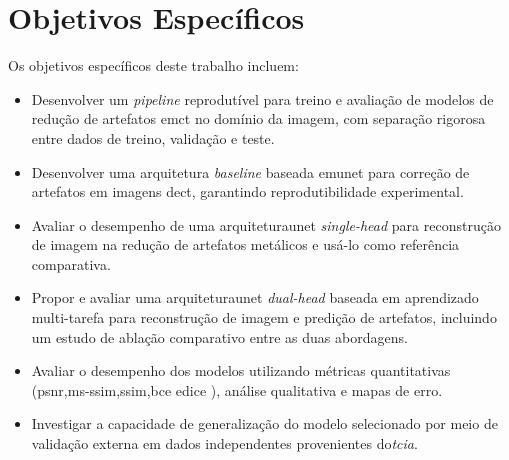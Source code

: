 \section{Objetivos Específicos}

Os objetivos específicos deste trabalho incluem:

\begin{itemize}
    \item Desenvolver um \textit{pipeline} reprodutível para treino e avaliação de modelos de redução de artefatos em\acrshort{ct} no domínio da imagem, com separação rigorosa entre dados de treino, validação e teste.

    \item Desenvolver uma arquitetura \textit{baseline} baseada em\acrshort{unet} para correção de artefatos em imagens de\acrshort{ct}, garantindo reprodutibilidade experimental.

    \item Avaliar o desempenho de uma arquitetura\acrshort{unet} \textit{single-head} para reconstrução de imagem na redução de artefatos metálicos e usá-lo como referência comparativa.

    \item Propor e avaliar uma arquitetura\acrshort{unet} \textit{dual-head} baseada em aprendizado multi-tarefa para reconstrução de imagem e predição de artefatos, incluindo um estudo de ablação comparativo entre as duas abordagens.

    \item Avaliar o desempenho dos modelos utilizando métricas quantitativas (\acrshort{psnr},\acrshort{ms-ssim},\acrshort{ssim},\acrshort{bce} e\acrshort{dice} ), análise qualitativa e mapas de erro.

    \item Investigar a capacidade de generalização do modelo selecionado por meio de validação externa em dados independentes provenientes do\textit{\acrfull{tcia}}.
\end{itemize}